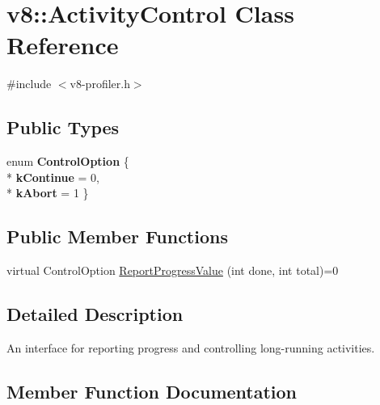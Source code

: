 \hypertarget{classv8_1_1_activity_control}{}\section{v8\+:\+:Activity\+Control Class Reference}
\label{classv8_1_1_activity_control}


{\ttfamily \#include $<$v8-\/profiler.\+h$>$}

\subsection*{Public Types}
\begin{DoxyCompactItemize}
\item 
enum {\bfseries Control\+Option} \{ \\*
{\bfseries k\+Continue} = 0, 
\\*
{\bfseries k\+Abort} = 1
 \}\hypertarget{classv8_1_1_activity_control_a6d261e8c21e8076ce86b4add231a8ef9}{}\label{classv8_1_1_activity_control_a6d261e8c21e8076ce86b4add231a8ef9}

\end{DoxyCompactItemize}
\subsection*{Public Member Functions}
\begin{DoxyCompactItemize}
\item 
virtual Control\+Option \hyperlink{classv8_1_1_activity_control_a1300f10611306a3e8f79239e057eb0bf}{Report\+Progress\+Value} (int done, int total)=0
\end{DoxyCompactItemize}


\subsection{Detailed Description}
An interface for reporting progress and controlling long-\/running activities. 

\subsection{Member Function Documentation}
